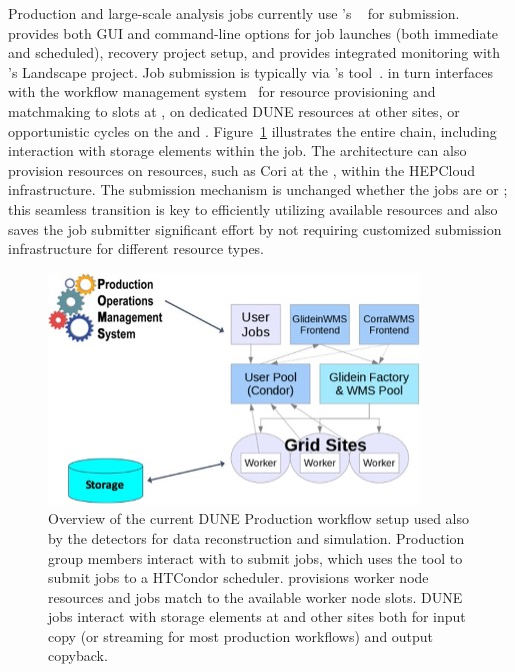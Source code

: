 \documentclass[../main-v1.tex]{subfiles}
\begin{document}
Production and large-scale analysis jobs currently use 's ~\cite{Mengel:2020wev} for submission.  provides both GUI and command-line options for job launches (both immediate and scheduled), recovery project setup, and provides integrated monitoring with 's Landscape project. Job submission is typically via 's  tool~\cite{box2014fife}.  in
turn interfaces with the  workflow management system~\cite{sfiligoi2009pilot} for resource provisioning and matchmaking to slots at , on dedicated DUNE resources at other sites, or opportunistic cycles on the    and . Figure~\ref{fig:workflowPOMS} illustrates the entire chain, including interaction with storage elements within the job.
The architecture can also provision resources on  resources, such as Cori at the , within the HEPCloud~\cite{mhashilkar2019hepcloud} infrastructure. The submission mechanism is unchanged whether the jobs are  or ; this seamless transition is key to efficiently utilizing available resources and also saves the job submitter significant effort by not requiring customized submission infrastructure for different resource types.

\begin{figure}[htb]
\centering
\includegraphics[width=.7\textwidth]{graphics/Workflow/POMSWorkflow.jpg}
\caption{Overview of the current DUNE Production workflow setup used also by the  detectors for data reconstruction and simulation. Production group members interact with  to submit jobs, which uses the  tool to submit jobs to a HTCondor scheduler.  provisions worker node resources and jobs match to the available worker node slots. DUNE jobs interact with storage elements  at  and other sites both for input copy (or streaming for most production workflows) and output copyback.}
\label{fig:workflowPOMS}       %
\end{figure}
\end{document}
